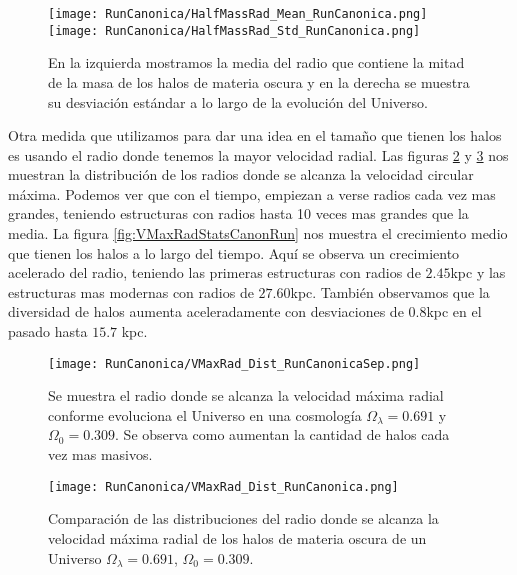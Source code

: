 \begin{figure}[ht!]
    \centering
    \texttt{[image: RunCanonica/HalfMassRad\_Mean\_RunCanonica.png]}
    \texttt{[image: RunCanonica/HalfMassRad\_Std\_RunCanonica.png]}
    \caption[Media y desviación estándar del radio de la mitad de la masa de un Universo $\Omega_\lambda = 0.691 $, $\Omega_0 = 0.309$]{\footnotesize En la izquierda mostramos la media del radio que contiene la mitad de la masa de los halos de materia oscura y en la derecha se muestra su desviación estándar a lo largo de la evolución del Universo.}
    \label{fig:HalfMassRadStatsCanonRun}
\end{figure}

Otra medida que utilizamos para dar una idea en el tamaño que tienen los halos es usando el radio donde tenemos la mayor velocidad radial. Las figuras \ref{fig:VMaxRadDistCanonRunSep} y \ref{fig:VMaxRadDistCanonRun} nos muestran la distribución de los radios donde se alcanza la velocidad circular máxima. Podemos ver que con el tiempo, empiezan a verse radios cada vez mas grandes, teniendo estructuras con radios hasta 10 veces mas grandes que la media. La figura \ref{fig:VMaxRadStatsCanonRun} nos muestra el crecimiento medio que tienen los halos a lo largo del tiempo. Aquí se observa un crecimiento acelerado del radio, teniendo las primeras estructuras con radios de $2.45$kpc y las estructuras mas modernas con radios de $27.60$kpc. También observamos que la diversidad de halos aumenta aceleradamente con desviaciones de $0.8$kpc en el pasado hasta $15.7$ kpc.

\begin{figure}[ht!]
    \centering
    \texttt{[image: RunCanonica/VMaxRad\_Dist\_RunCanonicaSep.png]}
    \caption[Radio donde se alcanza la velocidad máxima radial en la evolución de un Universo $\Omega_\lambda = 0.691 $, $\Omega_0 = 0.309$]{\footnotesize Se muestra el radio donde se alcanza la velocidad máxima radial conforme evoluciona el Universo en una cosmología $\Omega_\lambda = 0.691 $ y $\Omega_0 = 0.309$. Se observa como aumentan la cantidad de halos cada vez mas masivos.}
    \label{fig:VMaxRadDistCanonRunSep}
\end{figure}

\begin{figure}[ht!]
    \centering
    \texttt{[image: RunCanonica/VMaxRad\_Dist\_RunCanonica.png]}
    \caption[Distribución del radio donde se alcanza la velocidad máxima radial de un Universo $\Omega_\lambda = 0.691 $, $\Omega_0 = 0.309$]{\footnotesize Comparación de las distribuciones del radio donde se alcanza la velocidad máxima radial de los halos de materia oscura de un Universo $\Omega_\lambda = 0.691 $, $\Omega_0 = 0.309$.}
    \label{fig:VMaxRadDistCanonRun}
\end{figure}

